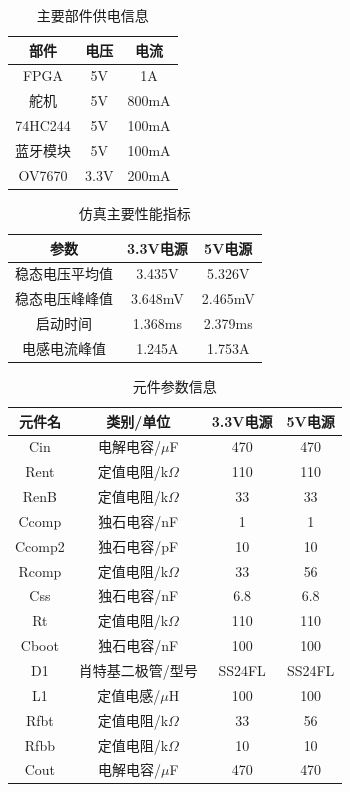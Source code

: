 \documentclass[a4paper]{paper}
\begin{document}
\begin{multicols}{2}
    \begin{table}[H]
        \centering
        \caption{主要部件供电信息}
        \label{t1}
        \begin{tabular}{|c|c|c|} \hline
            部件& 电压& 电流\\ \hline
            FPGA& 5V& 1A \\ \hline
            舵机& 5V & 800mA \\ \hline
            74HC244 & 5V& 100mA\\ \hline
            蓝牙模块 & 5V& 100mA\\ \hline
            OV7670& 3.3V& 200mA \\ \hline
        \end{tabular}
    \end{table}
    \begin{table}[H]
        \centering
        \caption{仿真主要性能指标}
        \label{t3}
        \begin{tabular}{|c|c|c|} \hline
            参数&3.3V电源&5V电源\\ \hline
            稳态电压平均值& 3.435V&5.326V\\ \hline
            稳态电压峰峰值& 3.648mV &2.465mV\\ \hline
            启动时间& 1.368ms&2.379ms\\ \hline
            电感电流峰值& 1.245A&1.753A\\ \hline
        \end{tabular}
    \end{table}
\end{multicols}
\clearpage
\begin{table}
    \centering
    \caption{元件参数信息}
    \label{t2}
    \begin{tabular}{|c|c|c|c|} \hline
        元件名&类别/单位& 3.3V电源& 5V电源\\ \hline
        Cin&电解电容/$\mu$F&470&470\\ \hline
        Rent&定值电阻/k$\Omega$&110&110\\ \hline
        RenB&定值电阻/k$\Omega$&33&33\\ \hline
        Ccomp&独石电容/nF&1&1\\ \hline
        Ccomp2&独石电容/pF&10&10\\ \hline
        Rcomp&定值电阻/k$\Omega$&33&56\\ \hline
        Css&独石电容/nF&6.8&6.8\\ \hline
        Rt&定值电阻/k$\Omega$&110&110\\ \hline
        Cboot&独石电容/nF&100&100\\ \hline
        D1&肖特基二极管/型号&SS24FL&SS24FL\\ \hline
        L1&定值电感/$\mu$H&100&100\\ \hline
        Rfbt&定值电阻/k$\Omega$&33&56\\ \hline
        Rfbb&定值电阻/k$\Omega$&10&10\\ \hline
        Cout&电解电容/$\mu$F&470&470\\ \hline
    \end{tabular}
\end{table}
\end{document}
